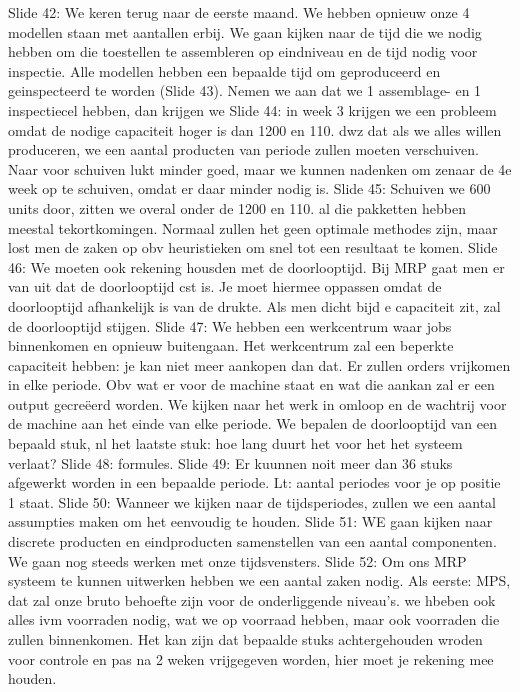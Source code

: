 \documentclass[10pt,a4paper]{report}
\begin{document}
Slide 42: We keren terug naar de eerste maand. We hebben opnieuw onze 4 modellen staan met aantallen erbij. We gaan kijken naar de tijd die we nodig hebben om die toestellen te assembleren op eindniveau en de tijd nodig voor inspectie. Alle modellen hebben een bepaalde tijd om geproduceerd en geinspecteerd te worden (Slide 43). Nemen we aan dat we 1 assemblage- en 1 inspectiecel hebben, dan krijgen we Slide 44: in week 3 krijgen we een probleem omdat de nodige capaciteit hoger is dan 1200 en 110. dwz dat als we alles willen produceren, we een aantal producten van periode zullen moeten verschuiven. Naar voor schuiven lukt minder goed, maar we kunnen nadenken om zenaar de 4e week op te schuiven, omdat er daar minder nodig is. 
Slide 45: Schuiven we 600 units door, zitten we overal onder de 1200 en 110. al die pakketten hebben meestal tekortkomingen. Normaal zullen het geen optimale methodes zijn, maar lost men de zaken op obv heuristieken om snel tot een resultaat te komen.
Slide 46: We moeten ook rekening housden met de doorlooptijd. Bij MRP gaat men er van uit dat de doorlooptijd cst is. Je moet hiermee oppassen omdat de doorlooptijd afhankelijk is van de drukte. Als men dicht bijd e capaciteit zit, zal de doorlooptijd stijgen.
Slide 47: We hebben een werkcentrum waar jobs binnenkomen en opnieuw buitengaan. Het werkcentrum zal een beperkte capaciteit hebben: je kan niet meer aankopen dan dat. Er zullen orders vrijkomen in elke periode. Obv wat er voor de machine staat en wat die aankan zal er een output gecreëerd worden. We kijken naar het werk in omloop en de wachtrij voor de machine aan het einde van elke periode. We bepalen de doorlooptijd van een bepaald stuk, nl het laatste stuk: hoe lang duurt het voor het het systeem verlaat?
Slide 48: formules.
Slide 49: Er kuunnen noit meer dan 36 stuks afgewerkt worden in een bepaalde periode. 
Lt: aantal periodes voor je op positie 1 staat.
Slide 50: Wanneer we kijken naar de tijdsperiodes, zullen we een aantal assumpties maken om het eenvoudig te houden. 
Slide 51: WE gaan kijken naar discrete producten en eindproducten samenstellen van een aantal componenten. We gaan nog steeds werken met onze tijdsvensters.
Slide 52: Om ons MRP systeem te kunnen uitwerken hebben we een aantal zaken nodig. Als eerste: MPS, dat zal onze bruto behoefte zijn voor de onderliggende niveau's. we hbeben ook alles ivm voorraden nodig, wat we op voorraad hebben, maar ook voorraden die zullen binnenkomen. Het kan zijn dat bepaalde stuks achtergehouden wroden voor controle en pas na 2 weken vrijgegeven worden, hier moet je rekening mee houden.
\end{document}
